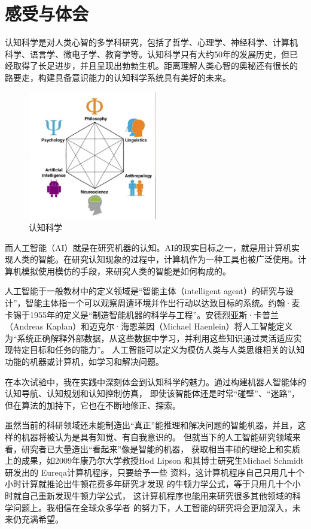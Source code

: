\documentclass{thuemp}
\begin{document}
\section{感受与体会}
认知科学是对人类心智的多学科研究，包括了哲学、心理学、神经科学、计算机
科学、语言学、微电子学、教育学等。认知科学只有大约50年的发展历史，但已
经取得了长足进步，并且呈现出勃勃生机。距离理解人类心智的奥秘还有很长的
路要走，构建具备意识能力的认知科学系统具有美好的未来。
\begin{figure}
  \centering
  \includegraphics[width=0.5\textwidth]{image/11.jpg}
  \caption{认知科学}
\end{figure}

而人工智能（AI）就是在研究机器的认知。AI的现实目标之一，就是用计算机实现人类的智能。在研究认知现象的过程中，计算机作为一种工具也被广泛使用。计算机模拟使用模仿的手段，来研究人类的智能是如何构成的。

人工智能于一般教材中的定义领域是“智能主体（intelligent agent）的研究与设计”，智能主体指一个可以观察周遭环境并作出行动以达致目标的系统。约翰·麦卡锡于1955年的定义是“制造智能机器的科学与工程”。安德烈亚斯·卡普兰（Andreas Kaplan）和迈克尔·海恩莱因（Michael Haenlein）将人工智能定义为“系统正确解释外部数据，从这些数据中学习，并利用这些知识通过灵活适应实现特定目标和任务的能力”。 人工智能可以定义为模仿人类与人类思维相关的认知功能的机器或计算机，如学习和解决问题。

在本次试验中，我在实践中深刻体会到认知科学的魅力。通过构建机器人智能体的认知导航、认知规划和认知控制仿真，
即使该智能体还是时常“碰壁”、“迷路”，但在算法的加持下，它也在不断地修正、探索。

虽然当前的科研领域还未能制造出“真正”能推理和解决问题的智能机器，并且，这样的机器将被认为是具有知觉、有自我意识的。
但就当下的人工智能研究领域来看，研究者已大量造出“看起来”像是智能的机器，
获取相当丰硕的理论上和实质上的成果，如2009年康乃尔大学教授Hod Lipson 
和其博士研究生Michael Schmidt 研发出的 Eureqa计算机程序，只要给予一些
资料，这计算机程序自己只用几十个小时计算就推论出牛顿花费多年研究才发现
的牛顿力学公式，等于只用几十个小时就自己重新发现牛顿力学公式，
这计算机程序也能用来研究很多其他领域的科学问题上。我相信在全球众多学者
的努力下，人工智能的研究将会更加深入，未来仍充满希望。
\end{document}
